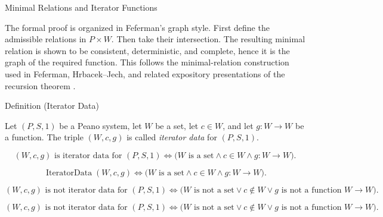 \begin{topicbox}{Minimal Relations and Iterator Functions}
\begin{exposition}
The formal proof is organized in Feferman's graph style. First define the
admissible relations in $P\times W$. Then take their intersection. The
resulting minimal relation is shown to be consistent, deterministic, and
complete, hence it is the graph of the required function. This follows the
minimal-relation construction used in Feferman, Hrbacek--Jech, and related
expository presentations of the recursion theorem
\citep{FefermanNumberSystems1964,hrbacek_jech1999,chi_recursion_wustl}.
\end{exposition}

\begin{definitionbox}{Definition (Iterator Data)}
\begin{definition}
\label{def:iterator-data-on-peano-system}
Let $(P,S,1)$ be a Peano system, let $W$ be a set, let $c\in W$, and let
$g:W\to W$ be a function. The triple $(W,c,g)$ is called \emph{iterator data}
for $(P,S,1)$.
\end{definition}
\end{definitionbox}

\begin{remark*}
\[
(W,c,g) \text{ is iterator data for } (P,S,1)
\Longleftrightarrow
\bigl(W \text{ is a set}\land c\in W\land g:W\to W\bigr).
\]
\end{remark*}

\begin{remark*}
\[
\operatorname{IteratorData}(W,c,g)
\Longleftrightarrow
\bigl(W \text{ is a set}\land c\in W\land g:W\to W\bigr).
\]
\end{remark*}

\begin{remark*}
\[
(W,c,g) \text{ is not iterator data for } (P,S,1)
\Longleftrightarrow
\bigl(W \text{ is not a set}\lor c\notin W\lor g \text{ is not a function } W\to W\bigr).
\]
\end{remark*}

\begin{remark*}
\[
(W,c,g) \text{ is not iterator data for } (P,S,1)
\Longleftrightarrow
\bigl(W \text{ is not a set}\lor c\notin W\lor g \text{ is not a function } W\to W\bigr).
\]
\end{remark*}


\end{topicbox}
